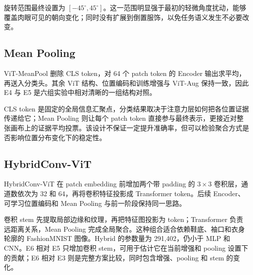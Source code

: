 旋转范围最终设置为 $[-45^\circ,45^\circ]$。这一范围明显强于最初的轻微角度扰动，能够覆盖肉眼可见的朝向变化；同时没有扩展到倒置服饰，以免任务语义发生不必要改变。

\subsection{Mean Pooling}

ViT-MeanPool 删除 CLS token，对 64 个 patch token 的 Encoder 输出求平均，再送入分类头。其余 ViT 结构、位置编码和训练增强与 ViT-Aug 保持一致，因此 E4 与 E5 是六组实验中相对清晰的一组结构对照。

CLS token 是固定的全局信息汇聚点，分类结果取决于注意力层如何把各位置证据传递给它；Mean Pooling 则让每个 patch token 直接参与最终表示，更接近对整张画布上的证据平均投票。该设计不保证一定提升准确率，但可以检验聚合方式是否影响位置分布变化下的稳定性。

\subsection{HybridConv-ViT}

HybridConv-ViT 在 patch embedding 前增加两个带 padding 的 $3\times3$ 卷积层，通道数依次为 32 和 64，再将卷积特征投影成 Transformer token。后续 Encoder、可学习位置编码和 Mean Pooling 与前一阶段保持同一思路。

卷积 stem 先提取局部边缘和纹理，再把特征图投影为 token；Transformer 负责远距离关系，Mean Pooling 完成全局聚合。这种组合适合依赖鞋底、袖口和衣身轮廓的 FashionMNIST 图像。Hybrid 的参数量为 291,402，仍小于 MLP 和 CNN。E6 相对 E5 只增加卷积 stem，可用于估计它在当前增强和 pooling 设置下的贡献；E6 相对 E3 则是完整方案比较，同时包含增强、pooling 和 stem 的变化。
